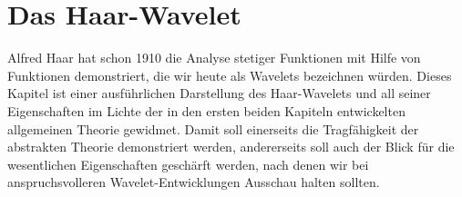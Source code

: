 %
%
%
\chapter{Das Haar-Wavelet
\label{chapter:haar-wavelet}}
Alfred Haar hat schon 1910 die Analyse stetiger Funktionen mit Hilfe
von Funktionen demonstriert, die wir heute als Wavelets bezeichnen
würden.
Dieses Kapitel ist einer ausführlichen Darstellung des Haar-Wavelets
und all seiner Eigenschaften im Lichte der in den ersten beiden Kapiteln
entwickelten allgemeinen Theorie gewidmet.
Damit soll einerseits die Tragfähigkeit der abstrakten Theorie
demonstriert werden, andererseits soll auch der Blick für die
wesentlichen Eigenschaften geschärft werden, nach denen wir bei
anspruchsvolleren Wavelet-Entwicklungen Ausschau halten sollten.








